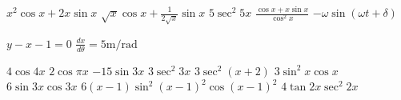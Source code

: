 \begin{Answer}[ref={exStandardDerivatives}]
\Question %
\begin{tasks}
	\task $x^{2} \cos  x +2 x \sin  x$
	\task $\sqrt{x} \cos  x +\frac{1}{2 \sqrt{x}} \sin  x$
	\task $5 \sec ^{2} 5 x$
	\task $\frac{\cos  x +x \sin  x}{\cos ^{2} x}$ 
	\task $ -\omega  \sin  \left (\omega  t +\delta \right )$ 
\end{tasks}

\Question %
$y -x -1 =0$ 
\Question %
$\frac{d x}{d \theta } =5 \mathrm{m}/\mbox{rad}$

\Question %
\begin{tasks}
	\task $4 \cos  4 x$
	\task $2 \cos  \pi  x$ 
	\task $ -15 \sin  3 x$ 
	\task $3 \sec ^{2} 3 x$ 
	\task $3 \sec ^{2} \left (x +2\right )$ 
	\task $3 \sin ^{2} x \cos  x$ 
	\task $6 \sin  3 x \cos  3 x$ 
	\task $6 \left (x -1\right ) \sin ^{2} \left (x -1\right )^{2} \cos  \left (x -1\right )^{2}$ 
	\task $4 \tan  2 x \sec ^{2} 2 x$
\end{tasks}	
\end{Answer}%

